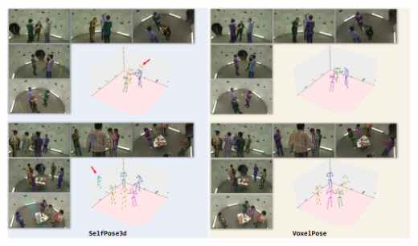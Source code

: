\documentclass{article}
\begin{document}
\begin{center}
    \includegraphics[scale=0.6]{selfpose3d-3.png}
\end{center}
\end{document}
